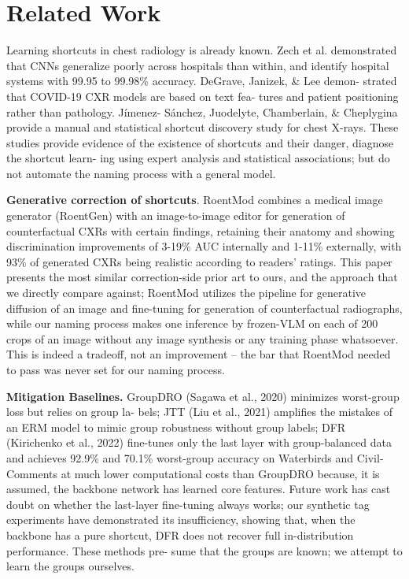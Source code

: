 \documentclass{ieeeaccess}
\begin{document}
\section{Related Work}
\label{sec:related}
Learning shortcuts in chest radiology is already known.
Zech et al. demonstrated that CNNs generalize poorly across
hospitals than within, and identify hospital systems with
99.95 to 99.98\% accuracy. DeGrave, Janizek, \& Lee demon-
strated that COVID-19 CXR models are based on text fea-
tures and patient positioning rather than pathology. Jímenez-
Sánchez, Juodelyte, Chamberlain, \& Cheplygina provide
a manual and statistical shortcut discovery study for chest
X-rays. These studies provide evidence of the existence
of shortcuts and their danger, diagnose the shortcut learn-
ing using expert analysis and statistical associations; but do
not automate the naming process with a general model.

\textbf{Generative correction of shortcuts}. RoentMod combines a medical image generator (RoentGen) with an image-to-image editor for generation of counterfactual CXRs with certain findings, retaining their anatomy and showing discrimination improvements of 3-19\% AUC internally and 1-11\% externally, with 93\% of generated CXRs being realistic according to readers' ratings. This paper presents the most similar correction-side prior art to ours, and the approach that we directly compare against; RoentMod utilizes the pipeline for generative diffusion of an image and fine-tuning for generation of counterfactual radiographs, while our naming process makes one inference by frozen-VLM on each of 200 crops of an image without any image synthesis or any training phase whatsoever. This is indeed a tradeoff, not an improvement – the bar that RoentMod needed to pass was never set for our naming process.

\textbf{Mitigation Baselines.}  GroupDRO (Sagawa et al.,
2020) minimizes worst-group loss but relies on group la-
bels; JTT (Liu et al., 2021) amplifies the mistakes of an ERM
model to mimic group robustness without group labels;
DFR (Kirichenko et al., 2022) fine-tunes only the last
layer with group-balanced data and achieves 92.9\% and
70.1\% worst-group accuracy on Waterbirds and Civil-
Comments at much lower computational costs than GroupDRO because, it is assumed, the backbone network has learned
core features. Future work has cast doubt on whether the
last-layer fine-tuning always works; our synthetic tag experiments have demonstrated its insufficiency, showing that,
when the backbone has a pure shortcut, DFR does not recover full in-distribution performance. These methods pre-
sume that the groups are known; we attempt to learn the
groups ourselves.
\end{document}
